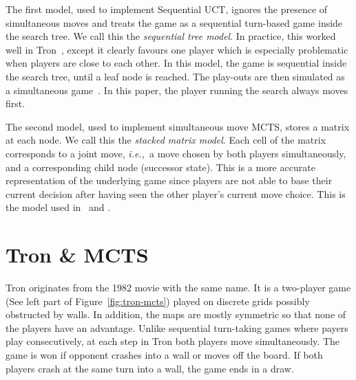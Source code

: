 \documentclass{article}
\newcommand{\ie}{{\it i.e.,}~}
\begin{document}
The first model, used to implement Sequential UCT, ignores the presence of simultaneous moves and treats the game as a sequential turn-based game inside the search tree. 
We call this the {\it sequential tree model}. 
In practice, this worked well in Tron~\cite{tron_cig,teuling_tron}, except it clearly favours one player which is especially problematic when players are close to each other. 
In this model, the game is sequential inside the search tree, until a leaf node is reached. The play-outs are then simulated as a simultaneous game~\cite{teuling_tron}. 
In this paper, the player running the search always moves first. 

The second model, used to implement simultaneous move MCTS, stores a matrix at each node. 
We call this the {\it stacked matrix model}.
Each cell of the matrix corresponds to a joint move, \ie a move chosen by both players simultaneously, and a corresponding child node (successor state). 
This is a more accurate representation of the underlying game since players are not able to base their current decision after having seen the other player's current move choice. 
This is the model used in~\cite{cig_paper} and \cite{mcts_goofspiel}.


\section{Tron \& MCTS}
\label{sec:tron_specific_mcts}

Tron originates from the 1982 movie with the same name. It is a two-player game (See left part of Figure~\ref{fig:tron-mcts}) played on discrete grids possibly obstructed by walls. In addition, the maps are mostly symmetric so that none of the players have an advantage. Unlike sequential turn-taking games where payers play consecutively, at each step in Tron both players move simultaneously. The game is won if opponent crashes into a wall or moves off the board. If both players crash at the same turn into a wall, the game ends in a draw.
\end{document}
